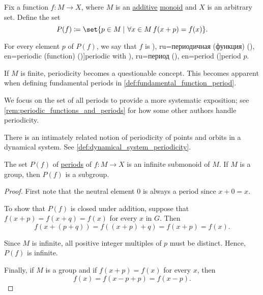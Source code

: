 \begin{definition}\label{def:periodic_function}\mimprovised
  Fix a function \( f: M \to X \), where \( M \) is an  \hyperref[con:additive_semigroup]{additive} \hyperref[def:monoid]{monoid} and \( X \) is an arbitrary set. Define the set
  \begin{equation*}
    P(f) \coloneqq \set{ p \in M \given \qforall* {x \in M} f(x + p) = f(x) }.
  \end{equation*}

  For every  element \( p \) of \( P(f) \), we say that \( f \) is \term[bg=периодична (функция) (\cite[318]{ИлинСадовничиСендов1989АнализТом2}), ru=периодичная (функция) (\cite[371]{Фихтенгольц1968ОсновыАнализаТом2}), en=periodic (function) (\cite[def. 5.1.1]{Tao2022AnalysisII})]{periodic} with \term[bg=период (\cite[318]{ИлинСадовничиСендов1989АнализТом2}), ru=период (\cite[371]{Фихтенгольц1968ОсновыАнализаТом2}), en=period (\cite[def. 8.3]{LidlNiederreiter1997FiniteFields}]{period} \( p \).
\end{definition}
\begin{comments}
  \item If \( M \) is finite, periodicity becomes a questionable concept. This becomes apparent when defining fundamental periods in \cref{def:fundamental_function_period}.

  \item We focus on the set of all periods to provide a more systematic exposition; see \cref{rem:periodic_functions_and_periods} for how some other authors handle periodicity.

  \item There is an intimately related notion of periodicity of points and orbits in a dynamical system. See \cref{def:dynamical_system_periodicity}.
\end{comments}

\begin{proposition}\label{thm:monoid_of_function_periods}
  The set \( P(f) \) of \hyperref[def:periodic_function]{periods} of \( f: M \to X \) is an infinite submonoid of \( M \). If \( M \) is a group, then \( P(f) \) is a subgroup.
\end{proposition}
\begin{proof}
  First note that the neutral element \( 0 \) is always a period since \( x + 0 = x \).

  To show that \( P(f) \) is closed under addition, suppose that \( f(x + p) = f(x + q) = f(x) \) for every \( x \) in \( G \). Then
  \begin{equation*}
    f(x + (p + q)) = f((x + p) + q) = f(x + p) = f(x).
  \end{equation*}

  Since \( M \) is infinite, all positive integer multiples of \( p \) must be distinct. Hence, \( P(f) \) is infinite.

  Finally, if \( M \) is a group and if \( f(x + p) = f(x) \) for every \( x \), then
  \begin{equation*}
    f(x) = f(x - p + p) = f(x - p).
  \end{equation*}
\end{proof}


